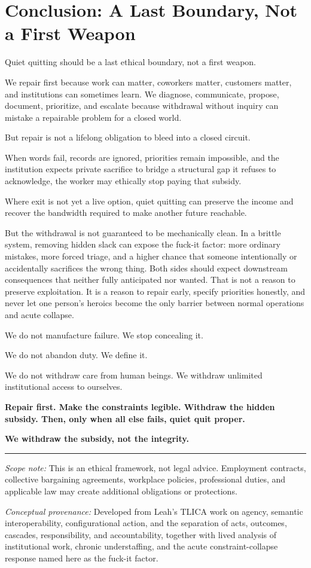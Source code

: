 \documentclass[11pt,oneside]{article}
\begin{document}
\section{Conclusion: A Last Boundary, Not a First
Weapon}\label{conclusion-a-last-boundary-not-a-first-weapon}

Quiet quitting should be a last ethical boundary, not a first weapon.

We repair first because work can matter, coworkers matter, customers
matter, and institutions can sometimes learn. We diagnose, communicate,
propose, document, prioritize, and escalate because withdrawal without
inquiry can mistake a repairable problem for a closed world.

But repair is not a lifelong obligation to bleed into a closed circuit.

When words fail, records are ignored, priorities remain impossible, and
the institution expects private sacrifice to bridge a structural gap it
refuses to acknowledge, the worker may ethically stop paying that
subsidy.

Where exit is not yet a live option, quiet quitting can preserve the
income and recover the bandwidth required to make another future
reachable.

But the withdrawal is not guaranteed to be mechanically clean. In a
brittle system, removing hidden slack can expose the fuck-it factor:
more ordinary mistakes, more forced triage, and a higher chance that
someone intentionally or accidentally sacrifices the wrong thing. Both
sides should expect downstream consequences that neither fully
anticipated nor wanted. That is not a reason to preserve exploitation.
It is a reason to repair early, specify priorities honestly, and never
let one person's heroics become the only barrier between normal
operations and acute collapse.

We do not manufacture failure. We stop concealing it.

We do not abandon duty. We define it.

We do not withdraw care from human beings. We withdraw unlimited
institutional access to ourselves.

\textbf{Repair first. Make the constraints legible. Withdraw the hidden
subsidy. Then, only when all else fails, quiet quit proper.}

\textbf{We withdraw the subsidy, not the integrity.}

\begin{center}\rule{0.5\linewidth}{0.5pt}\end{center}

\emph{Scope note:} This is an ethical framework, not legal advice.
Employment contracts, collective bargaining agreements, workplace
policies, professional duties, and applicable law may create additional
obligations or protections.

\emph{Conceptual provenance:} Developed from Leah's TLICA work on
agency, semantic interoperability, configurational action, and the
separation of acts, outcomes, cascades, responsibility, and
accountability, together with lived analysis of institutional work,
chronic understaffing, and the acute constraint-collapse response named
here as the fuck-it factor.
\end{document}
